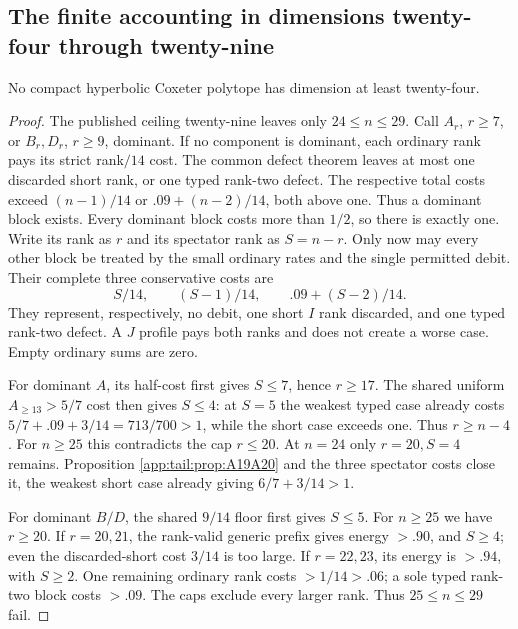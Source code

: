 \subsection{The finite accounting in dimensions twenty-four through twenty-nine}
\label{app:tail:24to29}
\begin{proposition}
\label{app:tail:prop:24to29}
No compact hyperbolic Coxeter polytope has dimension at least twenty-four.
\end{proposition}
\begin{proof}
The published ceiling twenty-nine leaves only $24\le n\le29$.
Call $A_r$, $r\ge7$, or $B_r,D_r$, $r\ge9$, dominant.
If no component is dominant, each ordinary rank pays its strict
rank$/14$ cost. The common defect theorem leaves at most one
discarded short rank, or one typed rank-two defect. The respective
total costs exceed $(n-1)/14$ or $.09+(n-2)/14$, both above one.
Thus a dominant block exists. Every dominant block costs more than
$1/2$, so there is exactly one. Write its rank as $r$ and its
spectator rank as $S=n-r$. Only now may every other block be treated
by the small ordinary rates and the single permitted debit.
Their complete three conservative costs are
\[
 S/14,\qquad(S-1)/14,\qquad .09+(S-2)/14.
\]
They represent, respectively, no debit, one short $I$ rank discarded,
and one typed rank-two defect. A $J$ profile pays both ranks and
does not create a worse case. Empty ordinary sums are zero.

For dominant $A$, its half-cost first gives $S\le7$, hence
$r\ge17$. The shared uniform $A_{\ge13}>5/7$ cost then gives
$S\le4$: at $S=5$ the weakest typed case already costs
$5/7+.09+3/14=713/700>1$, while the short case exceeds one.
Thus $r\ge n-4$. For $n\ge25$ this contradicts the cap $r\le20$.
At $n=24$ only $r=20,S=4$ remains. Proposition
\ref{app:tail:prop:A19A20} and the three spectator costs close
it, the weakest short case already giving $6/7+3/14>1$.

For dominant $B/D$, the shared $9/14$ floor first gives $S\le5$.
For $n\ge25$ we have $r\ge20$. If $r=20,21$, the rank-valid
generic prefix gives energy $>.90$, and $S\ge4$; even the
discarded-short cost $3/14$ is too large. If $r=22,23$, its
energy is $>.94$, with $S\ge2$. One remaining ordinary rank
costs $>1/14>.06$; a sole typed rank-two block costs $>.09$.
The caps exclude every larger rank. Thus $25\le n\le29$ fail.


\end{proof}

